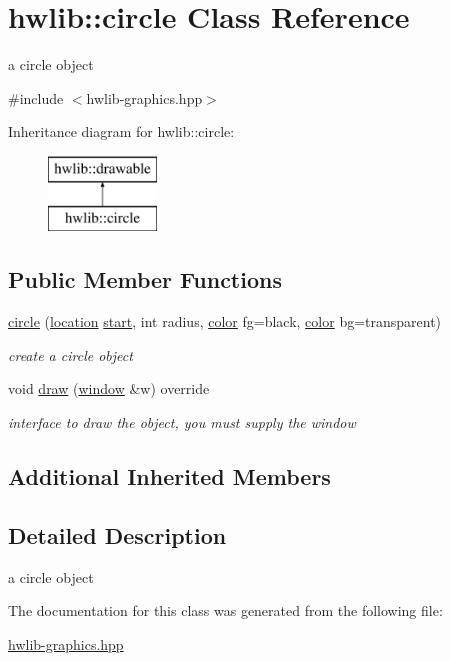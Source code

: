 \hypertarget{classhwlib_1_1circle}{}\section{hwlib\+:\+:circle Class Reference}
\label{classhwlib_1_1circle}


a circle object  




{\ttfamily \#include $<$hwlib-\/graphics.\+hpp$>$}

Inheritance diagram for hwlib\+:\+:circle\+:\begin{figure}[H]
\begin{center}
\leavevmode
\includegraphics[height=2.000000cm]{classhwlib_1_1circle}
\end{center}
\end{figure}
\subsection*{Public Member Functions}
\begin{DoxyCompactItemize}
\item 
\hyperlink{classhwlib_1_1circle_a072f40759c3083ea2bf1d3b6b7bb91f4}{circle} (\hyperlink{classhwlib_1_1location}{location} \hyperlink{classhwlib_1_1drawable_a6c31bc9303840a4317d3c95250c357ce}{start}, int radius, \hyperlink{classhwlib_1_1color}{color} fg=black, \hyperlink{classhwlib_1_1color}{color} bg=transparent)\hypertarget{classhwlib_1_1circle_a072f40759c3083ea2bf1d3b6b7bb91f4}{}\label{classhwlib_1_1circle_a072f40759c3083ea2bf1d3b6b7bb91f4}

\begin{DoxyCompactList}\small\item\em create a circle object \end{DoxyCompactList}\item 
void \hyperlink{classhwlib_1_1circle_a7a4d6bbd0692b757eee4615a8c5ea9f4}{draw} (\hyperlink{classhwlib_1_1window}{window} \&w) override\hypertarget{classhwlib_1_1circle_a7a4d6bbd0692b757eee4615a8c5ea9f4}{}\label{classhwlib_1_1circle_a7a4d6bbd0692b757eee4615a8c5ea9f4}

\begin{DoxyCompactList}\small\item\em interface to draw the object, you must supply the window \end{DoxyCompactList}\end{DoxyCompactItemize}
\subsection*{Additional Inherited Members}


\subsection{Detailed Description}
a circle object 

The documentation for this class was generated from the following file\+:\begin{DoxyCompactItemize}
\item 
\hyperlink{hwlib-graphics_8hpp}{hwlib-\/graphics.\+hpp}\end{DoxyCompactItemize}
